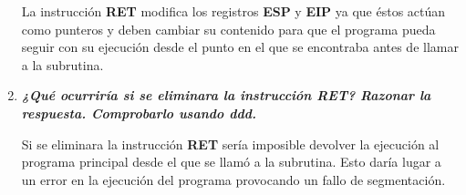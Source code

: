 \begin{enumerate}
	La instrucción \textbf{RET} modifica los registros \textbf{ESP} y \textbf{EIP} ya que éstos actúan como punteros y deben cambiar su contenido para que el programa pueda seguir con su ejecución desde el punto en el que se encontraba antes de llamar a la subrutina.
	
	\item \textbf{\textit{¿Qué ocurriría si se eliminara la instrucción RET? Razonar la respuesta. Comprobarlo usando ddd.}}
	
	Si se eliminara la instrucción \textbf{RET} sería imposible devolver la ejecución al programa principal desde el que se llamó a la subrutina. Esto daría lugar a un error en la ejecución del programa provocando un fallo de segmentación.
\end{enumerate}


